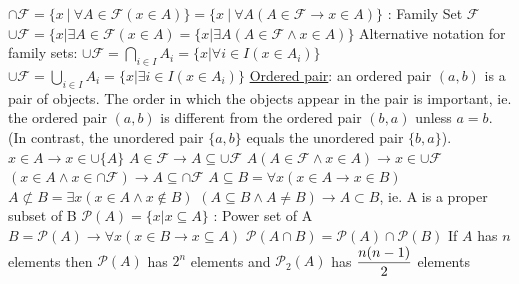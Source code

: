 \documentclass[12pt]{article}
\begin{document}
\begin{flushleft}
   \textbullet \quad $ \cap \mathcal{F} = \{x\ |\ \forall A \in \mathcal{F} (x \in A) \} = \{x\ | \ \forall A(A \in \mathcal{F} \rightarrow x \in A ) \}  $  :  Family Set $\mathcal{F}$ \linebreak
   \textbullet \quad $ \cup \mathcal{F} = \{x | \exists A \in \mathcal{F} (x \in A) = \{x | \exists A (A \in \mathcal{F} \land x \in A) \} $ \linebreak
   Alternative notation for family sets: \linebreak 
   \textbullet \quad $ \cup \mathcal{F} = \bigcap_{i \in I} A_i = \{x | \forall i \in I (x \in A_i)\} $ \linebreak
   \textbullet \quad $ \cup \mathcal{F} = \bigcup_{i \in I} A_i = \{x | \exists i \in I (x \in A_i)\} $ \linebreak
   \textbullet \quad \uline{Ordered pair}: an ordered pair $(a, b)$ is a pair of objects. The order in which the objects appear in the pair is important, ie. the ordered pair $(a, b)$ is different from the ordered pair $(b, a)$ unless $a = b$. (In contrast, the unordered pair $\{a, b\}$ equals the unordered pair $\{b, a\}$). \linebreak 
   \textbullet \quad $ x \in A \rightarrow x \in \cup \{A\} $ \linebreak
   \textbullet \quad $ A \in \mathcal{F} \rightarrow A \subseteq \cup \mathcal{F} $ \linebreak
   \textbullet \quad $ A (A \in \mathcal{F} \land x \in A) \rightarrow x \in \cup \mathcal{F}$ \linebreak
   \textbullet \quad $ (x \in A \land x \in \cap \mathcal{F}) \rightarrow A \subseteq \cap \mathcal{F} $ \linebreak
   \textbullet \quad $ A \subseteq B = \forall x (x \in A \rightarrow x \in B) $ \linebreak
   \textbullet \quad $ A \not\subset B = \exists x (x \in A \land x \notin B) $ \linebreak
   \textbullet \quad $ (A \subseteq B \land A \neq B) \rightarrow A \subset B $, ie. A is a proper subset of B \linebreak
   \textbullet \quad $ \mathcal{P}(A) = \{x | x \subseteq A\} $  :  Power set of A \linebreak
   \textbullet \quad $ B = \mathcal{P}(A) \rightarrow \forall x (x\in B \rightarrow x \subseteq A) $ \linebreak
   \textbullet \quad $ \mathcal{P}(A \cap B) = \mathcal{P}(A) \cap \mathcal{P}(B) $ \linebreak
   \textbullet \quad If $A$ has $n$ elements then $\mathcal{P}(A)$ has $2^n$ elements and $\mathcal{P}_2(A)$ has $\begin{displaystyle} \frac{n(n-1)}{2} \end{displaystyle} $ elements \linebreak
   

\end{flushleft}
\end{document}
